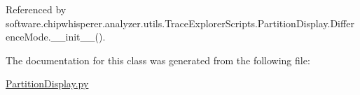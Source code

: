 Referenced by software.\+chipwhisperer.\+analyzer.\+utils.\+Trace\+Explorer\+Scripts.\+Partition\+Display.\+Difference\+Mode.\+\_\+\+\_\+init\+\_\+\+\_\+().



The documentation for this class was generated from the following file\+:\begin{DoxyCompactItemize}
\item 
\hyperlink{PartitionDisplay_8py}{Partition\+Display.\+py}\end{DoxyCompactItemize}
